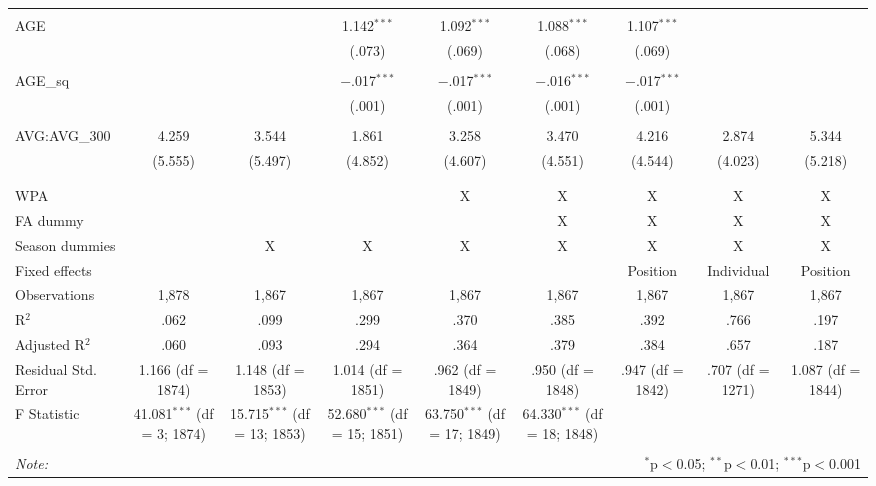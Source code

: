 \begin{table}[H]
\begin{tabular}{@{\extracolsep{5pt}}lcccccccc}
  & & & & & & & & \\
 AGE &  &  & 1.142$^{***}$ & 1.092$^{***}$ & 1.088$^{***}$ & 1.107$^{***}$ &  &  \\
  &  &  & (.073) & (.069) & (.068) & (.069) &  &  \\
  & & & & & & & & \\
 AGE\_sq &  &  & $-$.017$^{***}$ & $-$.017$^{***}$ & $-$.016$^{***}$ & $-$.017$^{***}$ &  &  \\
  &  &  & (.001) & (.001) & (.001) & (.001) &  &  \\
  & & & & & & & & \\
 AVG:AVG\_300 & 4.259 & 3.544 & 1.861 & 3.258 & 3.470 & 4.216 & 2.874 & 5.344 \\
  & (5.555) & (5.497) & (4.852) & (4.607) & (4.551) & (4.544) & (4.023) & (5.218) \\
  & & & & & & & & \\
\hline \\[-1.8ex]
WPA &  &  &  & X & X & X & X & X \\
FA dummy &  &  &  &  & X & X & X & X \\
Season dummies &  & X & X & X & X & X & X & X \\
Fixed effects &  &  &  &  &  & Position & Individual & Position \\
Observations & 1,878 & 1,867 & 1,867 & 1,867 & 1,867 & 1,867 & 1,867 & 1,867 \\
R$^{2}$ & .062 & .099 & .299 & .370 & .385 & .392 & .766 & .197 \\
Adjusted R$^{2}$ & .060 & .093 & .294 & .364 & .379 & .384 & .657 & .187 \\
Residual Std. Error & 1.166 (df = 1874) & 1.148 (df = 1853) & 1.014 (df = 1851) & .962 (df = 1849) & .950 (df = 1848) & .947 (df = 1842) & .707 (df = 1271) & 1.087 (df = 1844) \\
F Statistic & 41.081$^{***}$ (df = 3; 1874) & 15.715$^{***}$ (df = 13; 1853) & 52.680$^{***}$ (df = 15; 1851) & 63.750$^{***}$ (df = 17; 1849) & 64.330$^{***}$ (df = 18; 1848) &  &  &  \\
\hline
\hline \\[-1.8ex]
\textit{Note:}  & \multicolumn{8}{r}{$^{*}$p$<$0.05; $^{**}$p$<$0.01; $^{***}$p$<$0.001} \\
\end{tabular}
\end{table}

